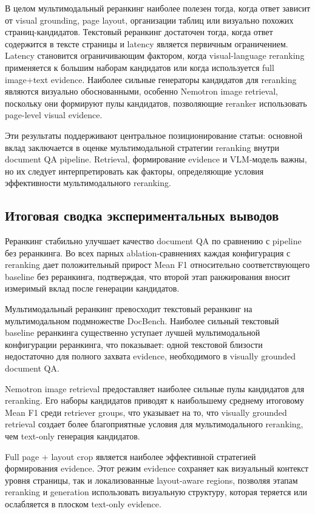 \documentclass[conference]{IEEEtran}
\begin{document}
В целом мультимодальный реранкинг наиболее полезен тогда, когда ответ зависит от visual grounding, page layout, организации таблиц или визуально похожих страниц-кандидатов. Текстовый реранкинг достаточен тогда, когда ответ содержится в тексте страницы и latency является первичным ограничением. Latency становится ограничивающим фактором, когда visual-language reranking применяется к большим наборам кандидатов или когда используется full image+text evidence. Наиболее сильные генераторы кандидатов для reranking являются визуально обоснованными, особенно Nemotron image retrieval, поскольку они формируют пулы кандидатов, позволяющие reranker использовать page-level visual evidence.

Эти результаты поддерживают центральное позиционирование статьи: основной вклад заключается в оценке мультимодальной стратегии reranking внутри document QA pipeline. Retrieval, формирование evidence и VLM-модель важны, но их следует интерпретировать как факторы, определяющие условия эффективности мультимодального reranking.

\subsection{Итоговая сводка экспериментальных выводов}

Реранкинг стабильно улучшает качество document QA по сравнению с pipeline без реранкинга. Во всех парных ablation-сравнениях каждая конфигурация с reranking дает положительный прирост Mean F1 относительно соответствующего baseline без реранкинга, подтверждая, что второй этап ранжирования вносит измеримый вклад после генерации кандидатов.

Мультимодальный реранкинг превосходит текстовый реранкинг на мультимодальном подмножестве DocBench. Наиболее сильный текстовый baseline реранкинга существенно уступает лучшей мультимодальной конфигурации реранкинга, что показывает: одной текстовой близости недостаточно для полного захвата evidence, необходимого в visually grounded document QA.

Nemotron image retrieval предоставляет наиболее сильные пулы кандидатов для reranking. Его наборы кандидатов приводят к наибольшему среднему итоговому Mean F1 среди retriever groups, что указывает на то, что visually grounded retrieval создает более благоприятные условия для мультимодального reranking, чем text-only генерация кандидатов.

Full page + layout crop является наиболее эффективной стратегией формирования evidence. Этот режим evidence сохраняет как визуальный контекст уровня страницы, так и локализованные layout-aware regions, позволяя этапам reranking и generation использовать визуальную структуру, которая теряется или ослабляется в плоском text-only evidence.
\end{document}
